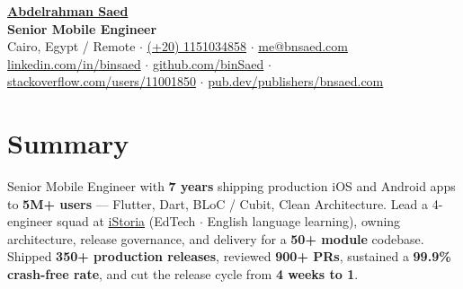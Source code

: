 \documentclass[10pt,a4paper]{article}
\begin{document}
    \begin{center}
        {\Huge \textbf{\hypersetup{urlcolor=primary}\href{https://bnsaed.com}{Abdelrahman Saed}}} \\
        \vspace{4pt}
        {\Large \textbf{\color{accent}Senior Mobile Engineer}} \\ \vspace{2pt}
        \small Cairo, Egypt / Remote $\cdot$ \href{tel:+201151034858}{(+20) 1151034858} $\cdot$ \href{mailto:me@bnsaed.com}{me@bnsaed.com} \\
        \small \href{https://www.linkedin.com/in/binsaed/}{linkedin.com/in/binsaed} $\cdot$ \href{https://github.com/binSaed}{github.com/binSaed} $\cdot$ \href{https://stackoverflow.com/users/11001850/abdelrahman-saed}{stackoverflow.com/users/11001850} $\cdot$ \href{https://pub.dev/publishers/bnsaed.com/packages}{pub.dev/publishers/bnsaed.com}
    \end{center}

    \vspace{-6pt}



    \section{Summary}\label{sec:summary}
    Senior Mobile Engineer with \textbf{7 years} shipping production iOS and Android apps to \textbf{5M+ users} --- Flutter, Dart, BLoC / Cubit, Clean Architecture. Lead a 4-engineer squad at \href{https://istoria.app/en/}{iStoria} (EdTech $\cdot$ English language learning), owning architecture, release governance, and delivery for a \textbf{50+ module} codebase. Shipped \textbf{350+ production releases}, reviewed \textbf{900+ PRs}, sustained a \textbf{99.9\% crash-free rate}, and cut the release cycle from \textbf{4 weeks to 1}.

\end{document}
